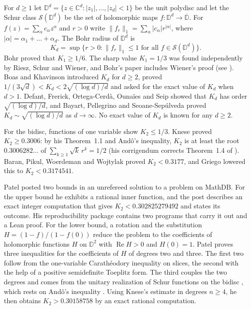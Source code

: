 \documentclass[11pt]{amsart}
\theoremstyle{remark}
\numberwithin{equation}{section}
\newcommand{\C}{\mathbb{C}}
\newcommand{\D}{\mathbb{D}}
\newcommand{\KneseVal}{0.3006}
\newcommand{\KneseRoot}{0.3006282\ldots}
\newcommand{\PatelUB}{0.302825279492}
\newcommand{\PatelLB}{0.30158758}
\newcommand{\BPWWUB}{0.3177}
\newcommand{\GriegoUB}{0.3174541}
\begin{document}
For $d\ge1$ let $\D^d=\{z\in\C^d:|z_1|,\dots,|z_d|<1\}$ be the unit polydisc and let the Schur class $\mathcal S(\D^d)$ be the set of holomorphic maps $f\colon\D^d\to\overline{\D}$. For $f(z)=\sum_\alpha c_\alpha z^\alpha$ and $r>0$ write $\|f_r\|_1=\sum_\alpha|c_\alpha|r^{|\alpha|}$, where $|\alpha|=\alpha_1+\dots+\alpha_d$. The Bohr radius of $\D^d$ is
\[
K_d=\sup\{r>0:\|f_r\|_1\le1\text{ for all }f\in\mathcal S(\D^d)\}.
\]
Bohr \cite{Boh14} proved that $K_1\ge1/6$. The sharp value $K_1=1/3$ was found independently by Riesz, Schur and Wiener, and Bohr's paper includes Wiener's proof (see \cite{BK97}). Boas and Khavinson \cite{BK97} introduced $K_d$ for $d\ge2$, proved $1/(3\sqrt d)<K_d<2\sqrt{(\log d)/d}$ and asked for the exact value of $K_d$ when $d>1$. Defant, Frerick, Ortega-Cerd\`a, Ouna\"ies and Seip \cite{DFOOS11} showed that $K_d$ has order $\sqrt{(\log d)/d}$, and Bayart, Pellegrino and Seoane-Sep\'ulveda \cite{BPS14} proved $K_d\sim\sqrt{(\log d)/d}$ as $d\to\infty$. No exact value of $K_d$ is known for any $d\ge2$.

For the bidisc, functions of one variable show $K_2\le1/3$. Knese \cite[Corollary~1.2]{Kne25} proved $K_2\ge\KneseVal$: by his Theorem~1.1 and And\^o's inequality, $K_2$ is at least the root $\KneseRoot$ of $\sum_{k\ge1}\sqrt k\,r^k=1/2$ (his corrigendum \cite{Kne26} corrects Theorem~1.4 of \cite{Kne25}). Baran, Pikul, Woerdeman and Wojtylak \cite[Theorem~6.4]{BPWW26} proved $K_2<\BPWWUB$, and Griego \cite{Gri26} lowered this to $K_2<\GriegoUB$.

Patel \cite{PatMDB} posted two bounds in an unrefereed solution to a problem on MathDB. For the upper bound he exhibits a rational inner function, and the post describes an exact integer computation that gives $K_2<\PatelUB$ and states its outcome. His reproducibility package \cite{PatZen} contains two programs that carry it out and a Lean proof. For the lower bound, a rotation and the substitution $H=(1-f)/(1-f(0))$ reduce the problem to the coefficients of holomorphic functions $H$ on $\D^2$ with $\operatorname{Re}H>0$ and $H(0)=1$. Patel proves three inequalities for the coefficients of $H$ of degrees two and three. The first two follow from the one-variable Carath\'eodory inequality on slices, the second with the help of a positive semidefinite Toeplitz form. The third couples the two degrees and comes from the unitary realization of Schur functions on the bidisc \cite{Agl90,BT98}, which rests on And\^o's inequality \cite{And63}. Using Knese's estimate \cite[Lemma~2.1]{Kne25} in degrees $n\ge4$, he then obtains $K_2>\PatelLB$ by an exact rational computation.
\end{document}
